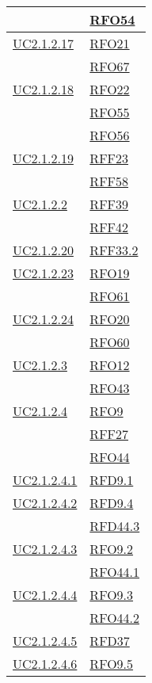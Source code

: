 \begin{longtable}{|>{\centering}m{5cm}|m{5cm}<{\centering}|}
	& \hyperlink{RFO54}{RFO54}\\ \hline
	\hyperlink{UC2.1.2.17}{UC2.1.2.17} & \hyperlink{RFO21}{RFO21}\\
	& \hyperlink{RFO67}{RFO67}\\ \hline
	\hyperlink{UC2.1.2.18}{UC2.1.2.18} & \hyperlink{RFO22}{RFO22}\\
	& \hyperlink{RFO55}{RFO55}\\
	& \hyperlink{RFO56}{RFO56}\\ \hline
	\hyperlink{UC2.1.2.19}{UC2.1.2.19} & \hyperlink{RFF23}{RFF23}\\
	& \hyperlink{RFF58}{RFF58}\\ \hline
	\hyperlink{UC2.1.2.2}{UC2.1.2.2} & \hyperlink{RFF39}{RFF39}\\
	& \hyperlink{RFF42}{RFF42}\\ \hline
	\hyperlink{UC2.1.2.20}{UC2.1.2.20} & \hyperlink{RFF33.2}{RFF33.2}\\ \hline
	\hyperlink{UC2.1.2.23}{UC2.1.2.23} & \hyperlink{RFO19}{RFO19}\\
	& \hyperlink{RFO61}{RFO61}\\ \hline
	\hyperlink{UC2.1.2.24}{UC2.1.2.24} & \hyperlink{RFO20}{RFO20}\\
	& \hyperlink{RFO60}{RFO60}\\ \hline
	\hyperlink{UC2.1.2.3}{UC2.1.2.3} & \hyperlink{RFO12}{RFO12}\\
	& \hyperlink{RFO43}{RFO43}\\ \hline
	\hyperlink{UC2.1.2.4}{UC2.1.2.4} & \hyperlink{RFO9}{RFO9}\\
	& \hyperlink{RFF27}{RFF27}\\
	& \hyperlink{RFO44}{RFO44}\\ \hline
	\hyperlink{UC2.1.2.4.1}{UC2.1.2.4.1} & \hyperlink{RFD9.1}{RFD9.1}\\ \hline
	\hyperlink{UC2.1.2.4.2}{UC2.1.2.4.2} & \hyperlink{RFD9.4}{RFD9.4}\\
	& \hyperlink{RFD44.3}{RFD44.3}\\ \hline
	\hyperlink{UC2.1.2.4.3}{UC2.1.2.4.3} & \hyperlink{RFO9.2}{RFO9.2}\\
	& \hyperlink{RFO44.1}{RFO44.1}\\ \hline
	\hyperlink{UC2.1.2.4.4}{UC2.1.2.4.4} & \hyperlink{RFO9.3}{RFO9.3}\\
	& \hyperlink{RFO44.2}{RFO44.2}\\ \hline
	\hyperlink{UC2.1.2.4.5}{UC2.1.2.4.5} & \hyperlink{RFD37}{RFD37}\\ \hline
	\hyperlink{UC2.1.2.4.6}{UC2.1.2.4.6} & \hyperlink{RFO9.5}{RFO9.5}\\ \hline

\end{longtable}
